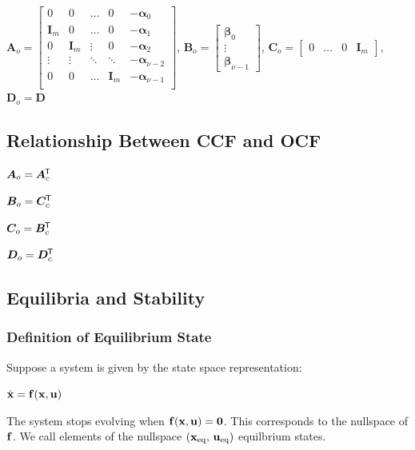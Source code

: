 \documentclass[11pt]{article}
\begin{document}
  \(\bm{A}_o =
  \begin{bmatrix}
    0 & 0 & \dots & 0 & -\bm{\alpha}_0 \\
    \bm{I}_m & 0 & \dots & 0 & -\bm{\alpha}_1 \\
    0 & \bm{I}_m & \vdots & 0 & -\bm{\alpha}_2 \\
    \vdots & \vdots & \ddots & \ddots & -\bm{\alpha}_{\nu - 2} \\
    0 & 0 & \dots & \bm{I}_m & -\bm{\alpha}_{\nu - 1} \\
  \end{bmatrix}\),
  \(\bm{B}_o = \begin{bmatrix} \bm{\beta}_0 \\ \vdots \\ \bm{\beta}_{\nu - 1}\end{bmatrix}\),
  \(\bm{C}_o =
  \begin{bmatrix}
    0 & \dots & 0 & \bm{I}_m
  \end{bmatrix}\),
  \(\bm{D}_o = \bm{D}\)

  \subsection{Relationship Between CCF and OCF}

  \(\bm{A}_o = \bm{A}_c^{\mkern-1.5mu\mathsf{T}}\)

  \(\bm{B}_o = \bm{C}_c^{\mkern-1.5mu\mathsf{T}}\)

  \(\bm{C}_o = \bm{B}_c^{\mkern-1.5mu\mathsf{T}}\)

  \(\bm{D}_o = \bm{D}_c^{\mkern-1.5mu\mathsf{T}}\)

  \pagebreak

  \subsection{Equilibria and Stability}

  \subsubsection{Definition of Equilibrium State}

  Suppose a system is given by the state space representation:

  \(\dot{\mathbf{x}} = \mathbf{f}(\mathbf{x}, \mathbf{u})\)

  The system stops evolving when \(\mathbf{f}(\mathbf{x}, \mathbf{u}) = \mathbf{0}\). This corresponds to the
  nullspace of \(\mathbf{f}\). We call elements of the nullspace \((\mathbf{x}_{\textrm{eq}},\, \mathbf{u}_{\textrm{eq}})\)
  equilbrium states.
\end{document}
